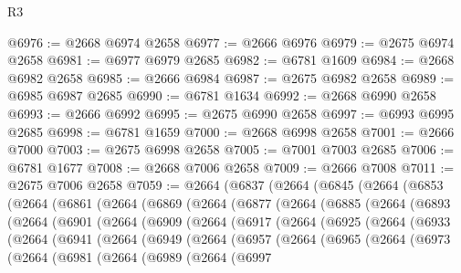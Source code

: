 \begin{lexlean}{R3}
\begin{coremodule}
@6976 := @2668 @6974 @2658
@6977 := @2666 @6976
@6979 := @2675 @6974 @2658
@6981 := @6977 @6979 @2685
@6982 := @6781 @1609
@6984 := @2668 @6982 @2658
@6985 := @2666 @6984
@6987 := @2675 @6982 @2658
@6989 := @6985 @6987 @2685
@6990 := @6781 @1634
@6992 := @2668 @6990 @2658
@6993 := @2666 @6992
@6995 := @2675 @6990 @2658
@6997 := @6993 @6995 @2685
@6998 := @6781 @1659
@7000 := @2668 @6998 @2658
@7001 := @2666 @7000
@7003 := @2675 @6998 @2658
@7005 := @7001 @7003 @2685
@7006 := @6781 @1677
@7008 := @2668 @7006 @2658
@7009 := @2666 @7008
@7011 := @2675 @7006 @2658
@7059 := @2664
    (@6837
      (@2664
        (@6845
          (@2664
            (@6853
              (@2664
                (@6861
                  (@2664
                    (@6869
                      (@2664
                        (@6877
                          (@2664
                            (@6885
                              (@2664
                                (@6893
                                  (@2664
                                    (@6901
                                      (@2664
                                        (@6909
                                          (@2664
                                            (@6917
                                              (@2664
                                                (@6925
                                                  (@2664
                                                    (@6933
                                                      (@2664
                                                        (@6941
                                                          (@2664
                                                            (@6949
                                                              (@2664
                                                                (@6957
                                                                  (@2664
                                                                    (@6965
                                                                      (@2664
                                                                        (@6973
                                                                          (@2664
                                                                            (@6981
                                                                              (@2664
                                                                                (@6989
                                                                                  (@2664
                                                                                    (@6997

\end{coremodule}
\end{lexlean}

